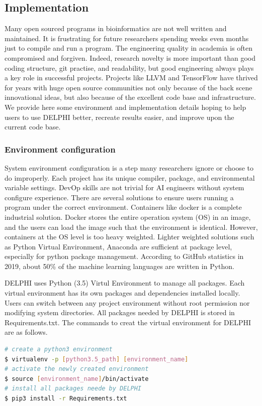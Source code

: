 \subsection{Implementation}
Many open sourced programs in bioinformatics are not well written and maintained. It is frustrating for future researchers spending weeks even months just to compile and run a program. The engineering quality in academia is often compromised and forgiven. Indeed, research novelty is more important than good coding structure, git practise, and readability, but good engineering always plays a key role in successful projects. Projects like LLVM \cite{lattner2004llvm} and TensorFlow \cite{tensorflow2015-whitepaper} have thrived for years with huge open source communities not only because of the back scene innovational ideas, but also because of the excellent code base and infrastructure. We provide here some environment and implementation details hoping to help users to use DELPHI better, recreate results easier, and improve upon the current code base.

\subsubsection{Environment configuration}
System environment configuration is a step many researchers ignore or choose to do improperly. Each project has its unique compiler, package, and environmental variable settings. DevOp skills are not trivial for AI engineers without system configure experience. There are several solutions to ensure users running a program under the correct environment. Containers like docker is a complete industrial solution. Docker stores the entire operation system (OS) in an image, and the users can load the image such that the environment is identical. However, containers at the OS level is too heavy weighted. Lighter weighted solutions such as Python Virtual Environment, Anaconda are sufficient at package level, especially for python package management. According to GitHub statistics in 2019, about 50\% of the machine learning languages are written in Python.

DELPHI uses Python (3.5) Virtul Environment to manage all packages. Each virtual environment has its own packages and dependencies installed locally. Users can switch between any project environment without root permission nor modifying system directories. All packages needed by DELPHI is stored in Requirements.txt. The commands to creat the virtual environment for DELPHI are as follows.
\begin{lstlisting}[language=bash,frame=single]
# create a python3 environment
$ virtualenv -p [python3.5_path] [environment_name] 
# activate the newly created environment
$ source [environment_name]/bin/activate 
# install all packages neede by DELPHI
$ pip3 install -r Requirements.txt 
\end{lstlisting}

